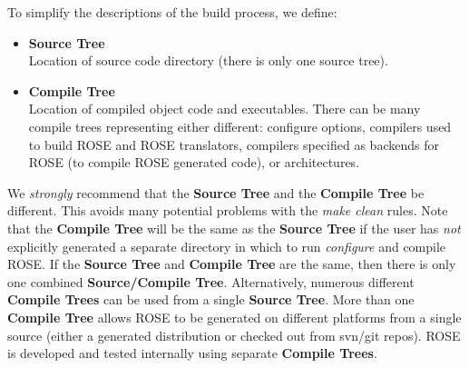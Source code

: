 To simplify the descriptions of the build process, we define:
\begin{itemize} 
   \item {\bf Source Tree} \\
         Location of source code directory (there is only one source tree).
   \item {\bf Compile Tree} \\
         Location of compiled object code and executables. There can be many compile trees
         representing either different: configure options, compilers used to build ROSE
         and ROSE translators, compilers specified as backends for ROSE (to compile ROSE
         generated code), or architectures.
\end{itemize}

We {\em strongly} recommend that the {\bf Source Tree} and the {\bf Compile Tree} be
different. This avoids many potential problems with the {\em make clean} rules.
Note that the {\bf Compile Tree} will be the same as the {\bf Source Tree}
if the user has {\em not} explicitly generated a separate directory in which to
run {\em configure} and compile ROSE. If the {\bf Source Tree} and {\bf Compile Tree} 
are the same, then there is only one combined {\bf Source/Compile Tree}.
Alternatively, numerous different {\bf Compile Trees} can be used from 
a single {\bf Source Tree}.  More than one {\bf Compile Tree} allows
ROSE to be generated on different platforms from a single source 
(either a generated distribution or checked out from svn/git repos).  ROSE is developed 
and tested internally using separate {\bf Compile Trees}. \\


